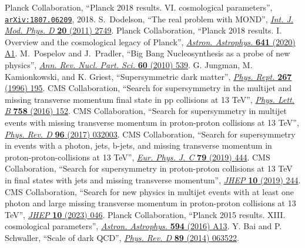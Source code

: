 \begin{thebibliography}{99}
 {Planck} Collaboration, ``Planck 2018 results. VI. cosmological parameters'', \href{http://www.arxiv.org/abs/1807.06209}{\texttt{arXiv:1807.06209}}, 2018.
 S.~Dodelson, ``The real problem with MOND'', \href{http://dx.doi.org/10.1142/S0218271811020561}{\textit{Int. J. Mod. Phys. D} \textbf{20} (2011) 2749}.
 Planck Collaboration, ``Planck 2018 results. I. Overview and the cosmological legacy of Planck'', \href{http://dx.doi.org/10.1051/0004-6361/201833880}{\textit{Astron. Astrophys.} \textbf{641} (2020) A1}.
 M.~Pospelov and J.~Pradler, ``Big Bang Nucleosynthesis as a probe of new physics'', \href{http://dx.doi.org/10.1146/annurev.nucl.012809.104521}{\textit{Ann. Rev. Nucl. Part. Sci.} \textbf{60} (2010) 539}.
 G. Jungman, M. Kamionkowski, and K. Griest, ``Supersymmetric dark matter'', \href{https://doi.org/10.1016/0370-1573(95)00058-5}{\textit{Phys. Rept.} \textbf{267} (1996) 195}.
 CMS Collaboration, ``Search for supersymmetry in the multijet and missing transverse momentum final state in pp collisions at 13 TeV'', \href{http://dx.doi.org/10.1016/j.physletb.2016.05.002}{\textit{Phys. Lett. B} \textbf{758} (2016) 152}.
 CMS Collaboration, ``Search for supersymmetry in multijet events with missing transverse momentum in proton-proton collisions at 13 TeV'', \href{http://dx.doi.org/10.1103/PhysRevD.96.032003}{\textit{Phys. Rev. D} \textbf{96} (2017) 032003}.
 CMS Collaboration, ``Search for supersymmetry in events with a photon, jets, b-jets, and missing transverse momentum in proton-proton-collisions at 13 TeV'', \href{http://dx.doi.org/10.1140/epjc/s10052-019-6926-x}{\textit{Eur. Phys. J. C} \textbf{79} (2019) 444}.
 CMS Collaboration, ``Search for supersymmetry in proton-proton collisions at 13 TeV in final states with jets and missing transverse momentum'', \href{http://dx.doi.org/10.1007/JHEP10(2019)244}{\textit{JHEP} \textbf{10} (2019) 244}.
 CMS Collaboration, ``Search for new physics in multijet events with at least one photon and large missing transverse momentum in proton-proton collisions at 13 TeV'', \href{http://dx.doi.org/10.1007/JHEP10(2023)046}{\textit{JHEP} \textbf{10} (2023) 046}.
 {Planck} Collaboration, ``{Planck} 2015 results. XIII. cosmological parameters'', \href{http://dx.doi.org/10.1051/0004-6361/201525830}{\textit{Astron. Astrophys.} \textbf{594} (2016) A13}.
 Y. Bai and P. Schwaller, ``Scale of dark QCD'', \href{https://doi.org/10.1103/PhysRevD.89.063522}{\textit{Phys. Rev. D} \textbf{89} (2014) 063522}.

\end{thebibliography}
